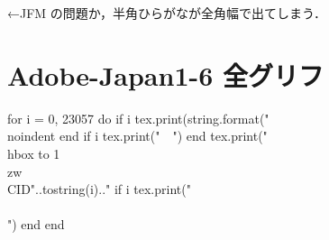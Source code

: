 \documentclass{bxjsarticle}
\begin{document}
 ←JFM の問題か，半角ひらがなが全角幅で出てしまう．

\newpage

\section*{Adobe-Japan1-6 全グリフ}

{\footnotesize
\begin{luacode*}
for i = 0, 23057 do
   if i %
      tex.print(string.format("\\noindent%
   end
   if i %
      tex.print("　")
   end
   tex.print("\\hbox to 1\\zw{\\CID{"..tostring(i).."}}%
   if i %
      tex.print("\\\\")
   end
end
\end{luacode*}
}
\end{document}

